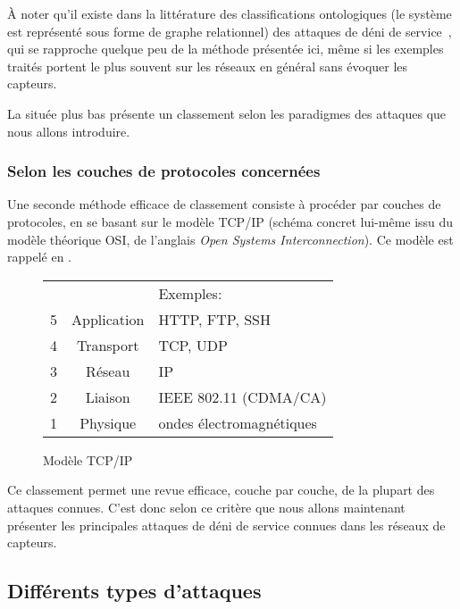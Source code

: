 À noter qu'il existe dans la littérature des classifications ontologiques (le système est représenté sous forme de graphe relationnel) des attaques de déni de service~\cite{VS10}, qui se rapproche quelque peu de la méthode présentée ici, même si les exemples traités portent le plus souvent sur les réseaux en général sans évoquer les capteurs.

La  située plus bas présente un classement selon les paradigmes des attaques que nous allons introduire.

\subsubsection{Selon les couches de protocoles concernées}
Une seconde méthode efficace de classement consiste à procéder par couches de protocoles, en se basant sur le modèle TCP/IP (schéma concret lui-même issu du modèle théorique OSI, de l'anglais \textit{Open Systems Interconnection}).
Ce modèle est rappelé en .
\begin{figure}[!ht]
    \centering
    \begin{tabular}{c |c| l}
        \multicolumn{2}{c}{} & Exemples:\\
        \cline{2-2}
        5 & Application & HTTP, FTP, SSH\\
        \cline{2-2}
        4 & Transport & TCP, UDP\\
        \cline{2-2}
        3 & Réseau & IP\\
        \cline{2-2}
        2 & Liaison & IEEE 802.11 (CDMA/CA)\\
        \cline{2-2}
        1 & Physique & ondes électromagnétiques\\
        \cline{2-2}
     \end{tabular}
    \medskip
    \caption{Modèle TCP/IP}\label{ea:fig:tcpip}
\end{figure}

Ce classement permet une revue efficace, couche par couche, de la plupart des attaques connues.
C'est donc selon ce critère que nous allons maintenant présenter les principales attaques de déni de service connues dans les réseaux de capteurs.

\subsection{Différents types d'attaques}

